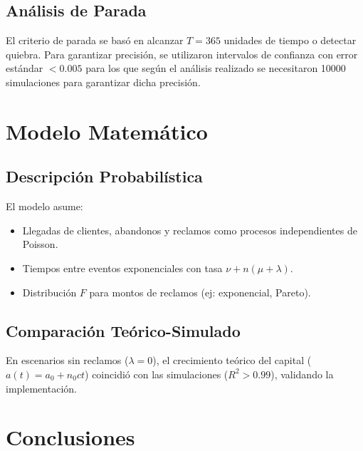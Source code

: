 \documentclass{article}
\begin{document}
\subsection{Análisis de Parada}
El criterio de parada se basó en alcanzar \( T = 365 \) unidades de tiempo o detectar quiebra. Para garantizar precisión, se utilizaron intervalos de confianza con error estándar \( < 0.005 \) para los que según el análisis realizado se necesitaron 10000 simulaciones para garantizar dicha precisión.

\section{Modelo Matemático}
\subsection{Descripción Probabilística}
El modelo asume:
\begin{itemize}
    \item Llegadas de clientes, abandonos y reclamos como procesos independientes de Poisson.
    \item Tiempos entre eventos exponenciales con tasa \( \nu + n(\mu + \lambda) \).
    \item Distribución \( F \) para montos de reclamos (ej: exponencial, Pareto).
\end{itemize}

\subsection{Comparación Teórico-Simulado}
En escenarios sin reclamos (\( \lambda = 0 \)), el crecimiento teórico del capital (\( a(t) = a_0 + n_0 c t \)) coincidió con las simulaciones (\( R^2 > 0.99 \)), validando la implementación.

\section{Conclusiones}
\end{document}
